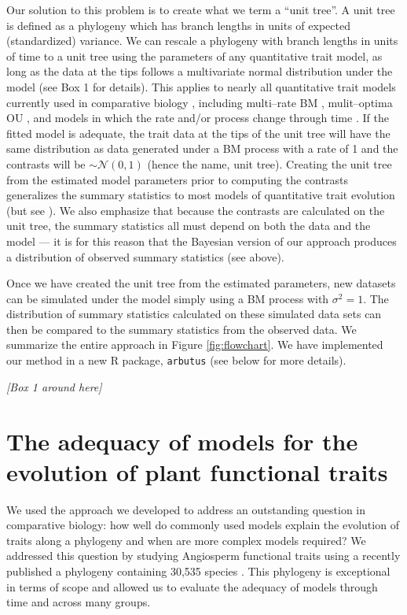 \documentclass[a4paper,12pt]{article}
\begin{document}
Our solution to this problem is to create what we term a ``unit tree''. A unit tree is defined as a phylogeny which has branch lengths in units of expected (standardized) variance. We can rescale a phylogeny with branch lengths in units of time to a unit tree using the parameters of any quantitative trait model, as long as the data at the tips follows a multivariate normal distribution under the model (see Box 1 for details). This applies to nearly all quantitative trait models currently used in comparative biology \citep{Omeara2012}, including multi--rate BM \citep{Omeara2006, Eastman2011}, mulit--optima OU \citep{ButlerKing2004, Beaulieu2012, UyedaBayou}, and models in which the rate and/or process change through time \citep{Blomberg2003, SlaterMEE}. If the fitted model is adequate, the trait data at the tips of the unit tree will have the same distribution as data generated under a BM process with a rate of 1 and the contrasts will be $\sim \mathcal{N}(0,1)$ (hence the name, unit tree). Creating the unit tree from the estimated model parameters prior to computing the contrasts generalizes the summary statistics to most models of quantitative trait evolution (but see \citep{Landis2012}). We also emphasize that because the contrasts are calculated on the unit tree, the summary statistics all must depend on both the data and the model --- it is for this reason that the Bayesian version of our approach produces a distribution of observed summary statistics (see above).

Once we have created the unit tree from the estimated parameters, new datasets can be simulated under the model simply using a BM process with $\sigma^2 = 1$. The distribution of summary statistics calculated on these simulated data sets can then be compared to the summary statistics from the observed data. We summarize the entire approach in Figure \ref{fig:flowchart}. We have implemented our method in a new R package, \texttt{arbutus} (see below for more details). 

\begin{center}
\textit{[Box 1 around here]}
\end{center}

\section{The adequacy of models for the evolution of plant functional traits}

We used the approach we developed to address an outstanding question in comparative biology: how well do commonly used models explain the evolution of traits along a phylogeny and when are more complex models required? We addressed this question by studying Angiosperm functional traits using a recently published a phylogeny containing 30,535 species \citep{Zanne2013}. This phylogeny is exceptional in terms of scope and allowed us to evaluate the adequacy of models through time and across many groups.  
\end{document}
